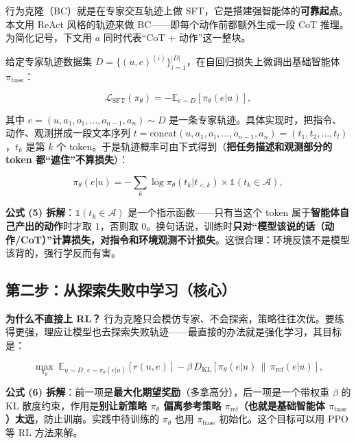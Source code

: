 \documentclass[11pt,UTF8,fontset=fandol]{ctexart}
\begin{document}
行为克隆（BC）就是在专家交互轨迹上做 SFT，它是搭建强智能体的\textbf{可靠起点}。本文用 ReAct 风格的轨迹来做 BC——即每个动作前都额外生成一段 CoT 推理。为简化记号，下文用 $a$ 同时代表“CoT + 动作”这一整块。

给定专家轨迹数据集 $D = \{(u, e)^{(i)}\}_{i=1}^{|D|}$，在自回归损失上微调出基础智能体 $\pi_{\text{base}}$：

\begin{equation*}
\mathcal{L}_{\text{SFT}}(\pi_\theta) = -\mathbb{E}_{e\sim D}\left[\pi_\theta(e|u)\right], \tag{3}
\end{equation*}

其中 $e=(u, a_1, o_1, \dots, o_{n-1}, a_n)\sim D$ 是一条专家轨迹。具体实现时，把指令、动作、观测拼成一段文本序列 $t=\text{concat}(u, a_1, o_1, \dots, o_{n-1}, a_n) = (t_1, t_2, \dots, t_l)$，$t_k$ 是第 $k$ 个 token。于是轨迹概率可由下式得到（\textbf{把任务描述和观测部分的 token 都“遮住”不算损失}）：

\begin{equation*}
\pi_\theta(e|u) = -\sum_{k} \log \pi_\theta(t_k | t_{<k}) \times \mathbb{1}(t_k \in \mathcal{A}), \tag{5}
\end{equation*}

\textbf{公式 (5) 拆解}：$\mathbb{1}(t_k\in\mathcal{A})$ 是一个指示函数——只有当这个 token 属于\textbf{智能体自己产出的动作}时才取 1，否则取 0。换句话说，训练时\textbf{只对“模型该说的话（动作/CoT）”计算损失，对指令和环境观测不计损失}。这很合理：环境反馈不是模型该背的，强行学反而有害。

\subsection{第二步：从探索失败中学习（核心）}

\textbf{为什么不直接上 RL？} 行为克隆只会模仿专家、不会探索，策略往往次优。要练得更强，理应让模型也去探索失败轨迹——最直接的办法就是强化学习，其目标是：

\begin{equation*}
\max_{\pi_\theta}\; \mathbb{E}_{u\sim D,\, e\sim\pi_\theta(e|u)}\left[r(u,e)\right] - \beta\, D_{\text{KL}}\left[\pi_\theta(e|u)\,\|\,\pi_{\text{ref}}(e|u)\right], \tag{6}
\end{equation*}

\textbf{公式 (6) 拆解}：前一项是\textbf{最大化期望奖励}（多拿高分），后一项是一个带权重 $\beta$ 的 KL 散度约束，作用是\textbf{别让新策略 $\pi_\theta$ 偏离参考策略 $\pi_{\text{ref}}$（也就是基础智能体 $\pi_{\text{base}}$）太远}，防止训崩。实践中待训练的 $\pi_\theta$ 也用 $\pi_{\text{base}}$ 初始化。这个目标可以用 PPO 等 RL 方法来解。
\end{document}
